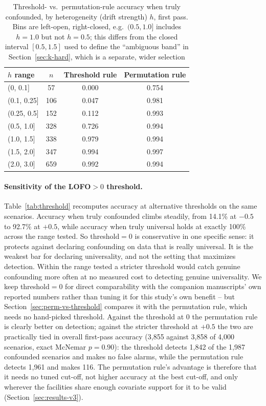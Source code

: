\documentclass[journal=dce]{CUP-JNL-DTM}%
\begin{document}
\begin{table}[htbp]
\centering
\caption{Threshold- vs.\ permutation-rule accuracy when truly confounded, by heterogeneity (drift strength) $h$, first pass. Bins are left-open, right-closed, e.g.\ $(0.5,1.0]$ includes $h=1.0$ but not $h=0.5$; this differs from the closed interval $[0.5,1.5]$ used to define the ``ambiguous band'' in Section~\ref{sec:k-hard}, which is a separate, wider selection}
\label{tab:h-band}
\small
\begin{tabular}{lccc}
\toprule
$h$ range & $n$ & Threshold rule & Permutation rule \\
\midrule
(0, 0.1]    & 57  & 0.000 & 0.754 \\
(0.1, 0.25] & 106 & 0.047 & 0.981 \\
(0.25, 0.5] & 152 & 0.112 & 0.993 \\
(0.5, 1.0]  & 328 & 0.726 & 0.994 \\
(1.0, 1.5]  & 338 & 0.979 & 0.994 \\
(1.5, 2.0]  & 347 & 0.994 & 0.997 \\
(2.0, 3.0]  & 659 & 0.992 & 0.994 \\
\bottomrule
\end{tabular}
\end{table}

\paragraph{Sensitivity of the LOFO$>0$ threshold.} Table~\ref{tab:threshold} recomputes accuracy at alternative thresholds on the same scenarios. Accuracy when truly confounded climbs steadily, from 14.1\% at $-0.5$ to 92.7\% at $+0.5$, while accuracy when truly universal holds at exactly 100\% across the range tested. So threshold$=0$ is conservative in one specific sense: it protects against declaring confounding on data that is really universal. It is the weakest bar for declaring universality, and not the setting that maximizes detection. Within the range tested a stricter threshold would catch genuine confounding more often at no measured cost to detecting genuine universality. We keep threshold$=0$ for direct comparability with the companion manuscripts' own reported numbers rather than tuning it for this study's own benefit -- but Section~\ref{sec:perm-vs-threshold} compares it with the permutation rule, which needs no hand-picked threshold. Against the threshold at $0$ the permutation rule is clearly better on detection; against the stricter threshold at $+0.5$ the two are practically tied in overall first-pass accuracy (3,855 against 3,858 of 4,000 scenarios, exact McNemar $p=0.90$): the threshold detects 1,842 of the 1,987 confounded scenarios and makes no false alarms, while the permutation rule detects 1,961 and makes 116. The permutation rule's advantage is therefore that it needs no tuned cut-off, not higher accuracy at the best cut-off, and only wherever the facilities share enough covariate support for it to be valid (Section~\ref{sec:results-v3}).
\end{document}
